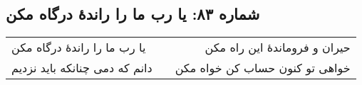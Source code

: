 \begin{center}
\section*{شماره ۸۳: یا رب ما را راندۀ درگاه مکن}
\label{sec:083}
\begin{longtable}{l p{0.5cm} r}
یا رب ما را راندهٔ درگاه مکن
&&
حیران و فروماندهٔ این راه مکن
\\
دانم که دمی چنانکه باید نزدیم
&&
خواهی تو کنون حساب کن خواه مکن
\\
\end{longtable}
\end{center}
